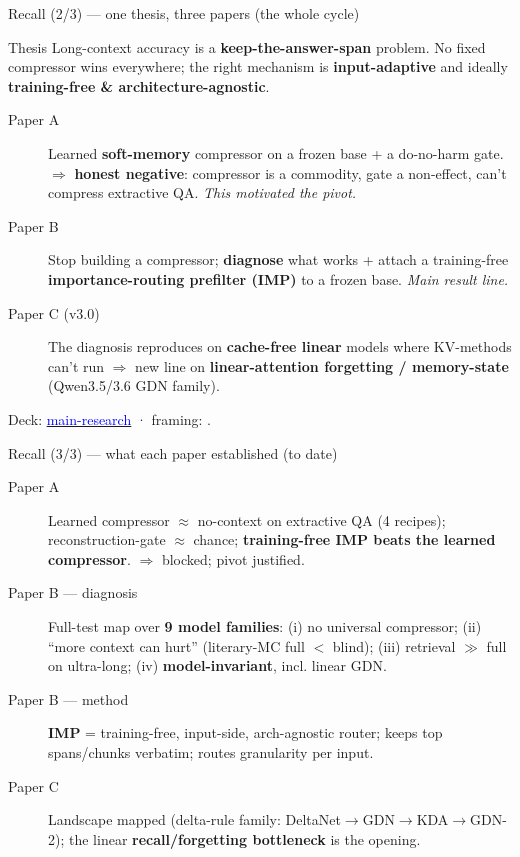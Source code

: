 \begin{frame}{Recall (2/3) --- one thesis, three papers (the whole cycle)}
  \small
  \begin{block}{Thesis}
    Long-context accuracy is a \textbf{keep-the-answer-span} problem. No fixed compressor wins everywhere; the right mechanism is \textbf{input-adaptive} and ideally \textbf{training-free \& architecture-agnostic}.
  \end{block}
  \begin{description}
    \item[Paper A] Learned \textbf{soft-memory} compressor on a frozen base + a do-no-harm gate. $\Rightarrow$ \textbf{honest negative}: compressor is a commodity, gate a non-effect, can't compress extractive QA. \emph{This motivated the pivot.}
    \item[Paper B] Stop building a compressor; \textbf{diagnose} what works + attach a training-free \textbf{importance-routing prefilter (IMP)} to a frozen base. \emph{Main result line.}
    \item[Paper C (v3.0)] The diagnosis reproduces on \textbf{cache-free linear} models where KV-methods can't run $\Rightarrow$ new line on \textbf{linear-attention forgetting / memory-state} (Qwen3.5/3.6 GDN family).
  \end{description}
  \scriptsize Deck: \href{../main-research.pdf}{\textcolor{blue}{main-research}} · framing: .
\end{frame}

\begin{frame}{Recall (3/3) --- what each paper established (to date)}
  \scriptsize
  \begin{description}
    \item[Paper A] Learned compressor $\approx$ no-context on extractive QA (4 recipes); reconstruction-gate $\approx$ chance; \textbf{training-free IMP beats the learned compressor}. $\Rightarrow$ blocked; pivot justified. 
    \item[Paper B --- diagnosis] Full-test map over \textbf{9 model families}: (i) no universal compressor; (ii) ``more context can hurt'' (literary-MC full $<$ blind); (iii) retrieval $\gg$ full on ultra-long; (iv) \textbf{model-invariant}, incl. linear GDN. 
    \item[Paper B --- method] \textbf{IMP} = training-free, input-side, arch-agnostic router; keeps top spans/chunks verbatim; routes granularity per input. 
    \item[Paper C] Landscape mapped (delta-rule family: DeltaNet$\to$GDN$\to$KDA$\to$GDN-2); the linear \textbf{recall/forgetting bottleneck} is the opening. 
  \end{description}
\end{frame}


